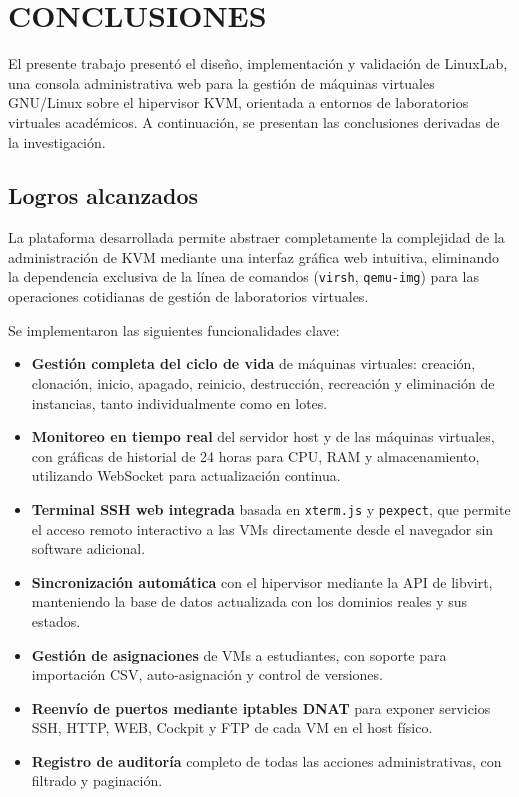 \section{CONCLUSIONES}
\label{sec:conclusiones}

El presente trabajo presentó el diseño, implementación y validación de LinuxLab,
una consola administrativa web para la gestión de máquinas virtuales GNU/Linux
sobre el hipervisor KVM, orientada a entornos de laboratorios virtuales
académicos. A continuación, se presentan las conclusiones derivadas de la
investigación.

\subsection{Logros alcanzados}

La plataforma desarrollada permite abstraer completamente la complejidad de la
administración de KVM mediante una interfaz gráfica web intuitiva, eliminando la
dependencia exclusiva de la línea de comandos (\texttt{virsh}, \texttt{qemu-img})
para las operaciones cotidianas de gestión de laboratorios virtuales.

Se implementaron las siguientes funcionalidades clave:
\begin{itemize}
    \item \textbf{Gestión completa del ciclo de vida} de máquinas virtuales:
    creación, clonación, inicio, apagado, reinicio, destrucción, recreación y
    eliminación de instancias, tanto individualmente como en lotes.
    \item \textbf{Monitoreo en tiempo real} del servidor host y de las máquinas
    virtuales, con gráficas de historial de 24 horas para CPU, RAM y
    almacenamiento, utilizando WebSocket para actualización continua.
    \item \textbf{Terminal SSH web integrada} basada en \texttt{xterm.js} y
    \texttt{pexpect}, que permite el acceso remoto interactivo a las VMs
    directamente desde el navegador sin software adicional.
    \item \textbf{Sincronización automática} con el hipervisor mediante la API
    de libvirt, manteniendo la base de datos actualizada con los dominios reales
    y sus estados.
    \item \textbf{Gestión de asignaciones} de VMs a estudiantes, con soporte
    para importación CSV, auto-asignación y control de versiones.
    \item \textbf{Reenvío de puertos mediante iptables DNAT} para exponer
    servicios SSH, HTTP, WEB, Cockpit y FTP de cada VM en el host físico.
    \item \textbf{Registro de auditoría} completo de todas las acciones
    administrativas, con filtrado y paginación.
\end{itemize}

